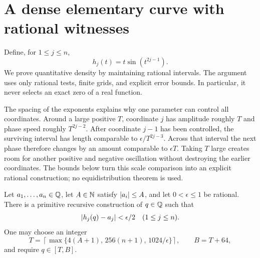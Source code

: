 \section{A dense elementary curve with rational witnesses}
\label{sec:density}

Define, for $1\le j\le n$,
\[
 h_j(t)=t\sin(t^{2j-1}).
\]
We prove quantitative density by maintaining rational intervals. The argument
uses only rational tests, finite grids, and explicit error bounds. In
particular, it never selects an exact zero of a real function.

The spacing of the exponents explains why one parameter can control all
coordinates. Around a large positive $T$, coordinate $j$ has amplitude
roughly $T$ and phase speed roughly $T^{2j-2}$. After coordinate $j-1$
has been controlled, the surviving interval has length comparable to
$\epsilon/T^{2j-3}$. Across that interval the next phase therefore changes
by an amount comparable to $\epsilon T$. Taking $T$ large creates room for
another positive and negative oscillation without destroying the earlier
coordinates. The bounds below turn this scale comparison into an explicit
rational construction; no equidistribution theorem is used.

\begin{theorem}\label{thm:density}
Let $a_1,\ldots,a_n\in\mathbb Q$, let $A\in\mathbb N$ satisfy
$\left|a_i\right|\le A$, and let $0<\epsilon\le1$ be rational. There is a
primitive recursive construction of $q\in\mathbb Q$ such that
\[
 \left|h_j(q)-a_j\right|<\epsilon/2\quad(1\le j\le n).
\]
One may choose an integer
\begin{equation}
 T=\left\lceil
       \max\{4(A+1),\,256(n+1),\,1024/\epsilon\}
    \right\rceil,
 \qquad B=T+64,\label{eq:density-size}
\end{equation}
and require $q\in[T,B]$.
\end{theorem}

